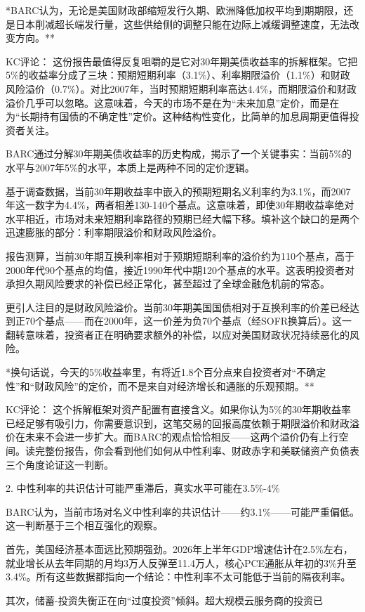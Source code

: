 \documentclass[11pt]{ctexart}
\begin{document}
*BARC认为，无论是美国财政部缩短发行久期、欧洲降低加权平均到期期限，还是日本削减超长端发行量，这些供给侧的调整只能在边际上减缓调整速度，无法改变方向。**

KC评论： 这份报告最值得反复咀嚼的是它对30年期美债收益率的拆解框架。它把5\%的收益率分成了三块：预期短期利率（3.1\%）、利率期限溢价（1.1\%）和财政风险溢价（0.7\%）。对比2007年，当时预期短期利率高达4.4\%，而期限溢价和财政溢价几乎可以忽略。这意味着，今天的市场不是在为“未来加息”定价，而是在为“长期持有国债的不确定性”定价。这种结构性变化，比简单的加息周期更值得投资者关注。

BARC通过分解30年期美债收益率的历史构成，揭示了一个关键事实：当前5\%的水平与2007年5\%的水平，本质上是两种不同的定价逻辑。

基于调查数据，当前30年期收益率中嵌入的预期短期名义利率约为3.1\%，而2007年这一数字为4.4\%，两者相差130-140个基点。这意味着，即使30年期收益率绝对水平相近，市场对未来短期利率路径的预期已经大幅下移。填补这个缺口的是两个迅速膨胀的部分：利率期限溢价和财政风险溢价。

报告测算，当前30年期互换利率相对于预期短期利率的溢价约为110个基点，高于2000年代90个基点的均值，接近1990年代中期120个基点的水平。这表明投资者对承担久期风险要求的补偿已经正常化，甚至超过了全球金融危机前的常态。

更引人注目的是财政风险溢价。当前30年期美国国债相对于互换利率的价差已经达到正70个基点——而在2000年，这一价差为负70个基点（经SOFR换算后）。这一翻转意味着，投资者正在明确要求额外的补偿，以应对美国财政状况持续恶化的风险。

*换句话说，今天的5\%收益率里，有将近1.8个百分点来自投资者对“不确定性”和“财政风险”的定价，而不是来自对经济增长和通胀的乐观预期。**

KC评论： 这个拆解框架对资产配置有直接含义。如果你认为5\%的30年期收益率已经足够有吸引力，你需要意识到，这笔交易的回报高度依赖于期限溢价和财政溢价在未来不会进一步扩大。而BARC的观点恰恰相反——这两个溢价仍有上行空间。读完整份报告，你会看到他们如何从中性利率、财政赤字和美联储资产负债表三个角度论证这一判断。

2. 中性利率的共识估计可能严重滞后，真实水平可能在3.5\%-4\%

BARC认为，当前市场对名义中性利率的共识估计——约3.1\%——可能严重偏低。这一判断基于三个相互强化的观察。

首先，美国经济基本面远比预期强劲。2026年上半年GDP增速估计在2.5\%左右，就业增长从去年同期的月均3万人反弹至11.4万人，核心PCE通胀从年初的3\%升至3.4\%。所有这些数据都指向一个结论：中性利率不太可能低于当前的隔夜利率。

其次，储蓄-投资失衡正在向“过度投资”倾斜。超大规模云服务商的投资已
\end{document}
